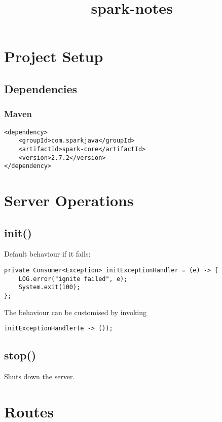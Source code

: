 \documentclass{report}
\title{spark-notes}
\begin{document}
\maketitle
\tableofcontents




\part{Project Setup}



\chapter{Dependencies}

\section{Maven}
\begin{verbatim}
<dependency>
    <groupId>com.sparkjava</groupId>
    <artifactId>spark-core</artifactId>
    <version>2.7.2</version>
</dependency>
\end{verbatim}





\part{Server Operations}



\chapter{init()}
Default behaviour if it fails:
\begin{verbatim}
private Consumer<Exception> initExceptionHandler = (e) -> {
    LOG.error("ignite failed", e);
    System.exit(100);
};
\end{verbatim}

The behaviour can be customised by invoking 
\begin{verbatim}
initExceptionHandler(e -> ());
\end{verbatim}


\chapter{stop()}
Shuts down the server.




\part{Routes}
\end{document}
